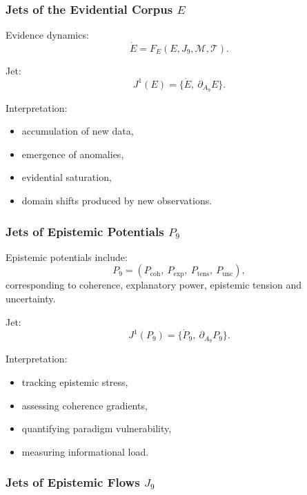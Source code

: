 \subsubsection{Jets of the Evidential Corpus \texorpdfstring{$E$}{E}}

Evidence dynamics:
\[
\dot{E}=F_E(E,J_9,\mathcal{M},\mathcal{T}).
\]

Jet:
\[
J^1(E)=\{\dot{E},\ \partial_{A_9}E\}.
\]

Interpretation:
\begin{itemize}
    \item accumulation of new data,
    \item emergence of anomalies,
    \item evidential saturation,
    \item domain shifts produced by new observations.
\end{itemize}


\subsubsection{Jets of Epistemic Potentials \texorpdfstring{$P_9$}{P_9}}

Epistemic potentials include:
\[
P_9=
(P_{\mathrm{coh}},\
 P_{\mathrm{exp}},\
 P_{\mathrm{tens}},\
 P_{\mathrm{unc}}),
\]
corresponding to coherence, explanatory power, epistemic tension and
uncertainty.

Jet:
\[
J^1(P_9)=\{\dot{P}_9,\ \partial_{A_9}P_9\}.
\]

Interpretation:
\begin{itemize}
    \item tracking epistemic stress,
    \item assessing coherence gradients,
    \item quantifying paradigm vulnerability,
    \item measuring informational load.
\end{itemize}


\subsubsection{Jets of Epistemic Flows \texorpdfstring{$J_9$}{J_9}}

